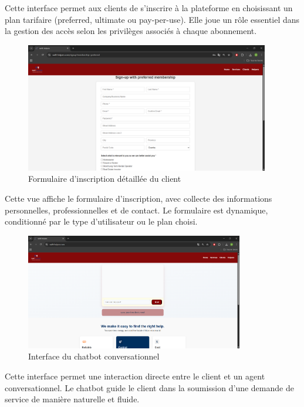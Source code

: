 \noindent
Cette interface permet aux clients de s’inscrire à la plateforme en choisissant un plan tarifaire (preferred, ultimate ou pay-per-use). Elle joue un rôle essentiel dans la gestion des accès selon les privilèges associés à chaque abonnement.

\vspace{0.5cm}

\begin{figure}[H]
    \centering
    \includegraphics[width=0.95\textwidth]{figures/inscription client.png}
    \caption{Formulaire d’inscription détaillée du client}
\end{figure}

\noindent
Cette vue affiche le formulaire d’inscription, avec collecte des informations personnelles, professionnelles et de contact. Le formulaire est dynamique, conditionné par le type d’utilisateur ou le plan choisi.


\vspace{0.5cm}

\begin{figure}[H]
    \centering
    \includegraphics[width=0.85\textwidth]{figures/interface principale.png}
    \caption{Interface du chatbot conversationnel}
\end{figure}

\noindent
Cette interface permet une interaction directe entre le client et un agent conversationnel. Le chatbot guide le client dans la soumission d’une demande de service de manière naturelle et fluide.


